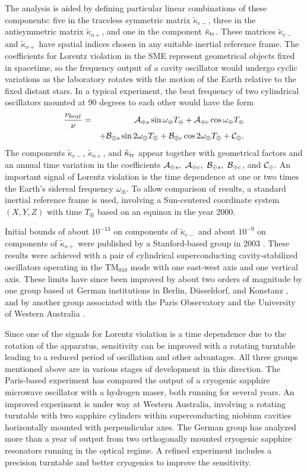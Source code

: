 \documentclass[twocolumn]{revtex4}
\def\om{\omega}
\def\fr#1#2{{{#1} \over {#2}}}
\def\ka{\kappa}
\newcommand{\bea}{\begin{eqnarray}}
\newcommand{\eea}{\end{eqnarray}}
\begin{document}
The analysis is aided by defining particular linear
combinations of these components:
five in the traceless symmetric matrix $\tilde\ka_{e-}$,
three in the antisymmetric matrix $\tilde\ka_{o+}$,
and one in the component $\tilde\ka_{\rm tr}$.
These matrices $\tilde\ka_{e-}$ and $\tilde\ka_{o+}$
have spatial indices chosen in any suitable inertial reference frame.
The coefficients for Lorentz violation in the SME
represent geometrical objects fixed in spacetime,
so the frequency output of a cavity oscillator
would undergo cyclic variations as the laboratory
rotates with the motion of the Earth relative
to the fixed distant stars.
In a typical experiment,
the beat frequency of two cylindrical oscillators
mounted at 90 degrees to each other
would have the form
\bea
\fr{\nu_{beat}}\nu &=&
{\cal A}_{\oplus s}\sin\om_\oplus T_\oplus
+{\cal A}_{\oplus c}\cos\om_\oplus T_\oplus
\nonumber \\
&&
+{\cal B}_{\oplus s}\sin2\om_\oplus T_\oplus
+{\cal B}_{\oplus c}\cos2\om_\oplus T_\oplus + {\cal C}_\oplus .
\label{dnu8}
\eea
The components $\tilde\ka_{e-}$, $\tilde\ka_{o+}$,
and $\tilde\ka_{\rm tr}$ appear together with geometrical
factors and an annual time variation in the coefficients
${\cal A}_{\oplus s}, \ {\cal A}_{\oplus c}, \
{\cal B}_{\oplus s}, \ {\cal B}_{\oplus c}$,
and ${\cal C}_{\oplus}.$
An important signal of Lorentz violation
is the time dependence at one or two times the Earth's sidereal
frequency $\om_\oplus$.
To allow comparison of results,
a standard inertial reference frame is used,
involving a Sun-centered
coordinate system $(X,Y,Z)$
with time $T_\oplus$ based on an equinox in the year 2000.

Initial bounds
of about $10^{-13}$ on components of $\tilde\ka_{e-}$
and about $10^{-9}$ on components of $\tilde\ka_{o+}$
were published by a Stanford-based group
in 2003 \cite{lipa}.
These results were achieved with
a pair of cylindrical superconducting cavity-stabilized oscillators
operating in the TM$_{010}$ mode
with one east-west axis and one vertical axis.
These limits have since been improved
by about two orders of magnitude
by one group based at German institutions
in Berlin, D\"usseldorf, and Konstanz \cite{muller},
and by another group
associated with the Paris Observatory
and the University of Western Australia \cite{wolftobar}.

Since one of the signals for Lorentz violation
is a time dependence due to the rotation of the apparatus,
sensitivity can be improved with a rotating turntable
leading to a reduced period of oscillation and other advantages.
All three groups mentioned above are in various stages of
development in this direction.
The Paris-based experiment has compared the output of a cryogenic sapphire
microwave oscillator with a hydrogen maser, both running for several years.
An improved experiment is under way at Western Australia,
involving a rotating turntable with
two sapphire cylinders within superconducting niobium cavities
horizontally mounted with perpendicular axes.
The German group has analyzed more than a year of output from
two orthogonally mounted cryogenic sapphire resonators
running in the optical regime.
A refined experiment includes a precision turntable
and better cryogenics to improve the sensitivity.
\end{document}
